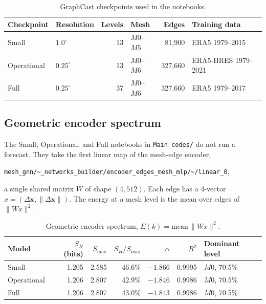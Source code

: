 \documentclass[11pt,a4paper]{article}
\begin{document}
\begin{table}[ht]
  \centering
  \caption{GraphCast checkpoints used in the notebooks.}
  \label{tab:gc-ckpts}
  \begin{tabular}{llrlrl}
    \toprule
    Checkpoint & Resolution & Levels & Mesh & Edges & Training data \\
    \midrule
    Small       & \(1.0^\circ\)  & 13 & \(M0\)--\(M5\) & 81{,}900  & ERA5 1979--2015 \\
    Operational & \(0.25^\circ\) & 13 & \(M0\)--\(M6\) & 327{,}660 & ERA5-HRES 1979--2021 \\
    Full        & \(0.25^\circ\) & 37 & \(M0\)--\(M6\) & 327{,}660 & ERA5 1979--2017 \\
    \bottomrule
  \end{tabular}
\end{table}

\subsection{Geometric encoder spectrum}

The Small, Operational, and Full notebooks in \texttt{Main codes/} do not run a forecast.
They take the first linear map of the mesh-edge encoder,
\begin{center}
\texttt{mesh\_gnn/\textasciitilde\_networks\_builder/encoder\_edges\_mesh\_mlp/\textasciitilde/linear\_0},
\end{center}
a single shared matrix \(W\) of shape \((4,512)\).
Each edge has a 4-vector \(x = (\Delta\mathbf{x}, \|\Delta\mathbf{x}\|)\).
The energy at a mesh level is the mean over edges of \(\|Wx\|^2\).

\begin{table}[ht]
  \centering
  \caption{Geometric encoder spectrum, \(E(k) = \mathrm{mean}\,\|Wx\|^2\).}
  \label{tab:gc-geom}
  \begin{tabular}{lrrrrrl}
    \toprule
    Model & \(S_H\) (bits) & \(S_{\max}\) & \(S_H/S_{\max}\) & \(\alpha\) & \(R^2\) & Dominant level \\
    \midrule
    Small       & 1.205 & 2.585 & 46.6\% & \(-1.866\) & 0.9995 & \(M0\), 70.5\% \\
    Operational & 1.206 & 2.807 & 42.9\% & \(-1.846\) & 0.9986 & \(M0\), 70.5\% \\
    Full        & 1.206 & 2.807 & 43.0\% & \(-1.843\) & 0.9986 & \(M0\), 70.5\% \\
    \bottomrule
  \end{tabular}
\end{table}
\end{document}
